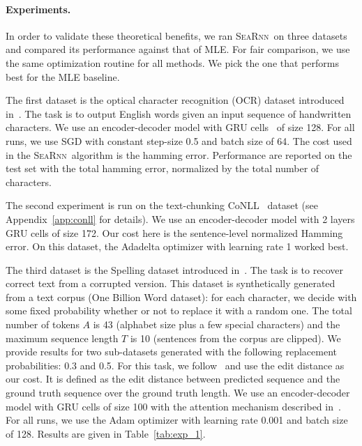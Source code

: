 \documentclass{article}
\newcommand{\SEARNN}{\textsc{SeaRnn}}
\begin{document}
	\vspace{-1mm}
	\paragraph{Experiments.}
	In order to validate these theoretical benefits, we ran \SEARNN\ on three datasets and compared its performance against that of MLE.
	For fair comparison, we use the same optimization routine for all methods. 
	We pick the one that performs best for the MLE baseline. 

	The first dataset is the optical character recognition (OCR) dataset introduced in~\citet{taskar03OCR}.
	The task is to output English words given an input sequence of handwritten characters.
	We use an encoder-decoder model with GRU cells~\citep{Cho2014} of size 128.
	For all runs, we use SGD with constant step-size 0.5 and batch size of 64.
	The cost used in the \SEARNN\ algorithm is the hamming error.
	Performance are reported on the test set with the total hamming error, normalized by the total number of characters.

	The second experiment is run on the text-chunking CoNLL~\citep{Sang2000} dataset (see Appendix~\ref{app:conll} for details).
	We use an encoder-decoder model with 2 layers GRU cells of size 172.
	Our cost here is the sentence-level normalized Hamming error.
    On this dataset, the Adadelta optimizer with learning rate 1 worked best.

	The third dataset is the Spelling dataset introduced in~\citet{Bahdanau2016}.
	The task is to recover correct text from a corrupted version.
    This dataset is synthetically generated from a text corpus (One Billion Word dataset): for each character, we decide with some fixed probability whether or not to replace it with a random one.
	The total number of tokens $A$ is 43 (alphabet size plus a few special characters) and the maximum sequence length $T$ is 10 (sentences from the corpus are clipped).
	We provide results for two sub-datasets generated with the following replacement probabilities:  0.3 and 0.5.
	For this task, we follow~\citet{Bahdanau2016} and use the edit distance as our cost.
	It is defined as the edit distance between predicted sequence and the ground truth sequence over the ground truth length.
	We use an encoder-decoder model with GRU cells of size 100 with the attention mechanism described in~\citep{Bahdanau2016}.
	For all runs, we use the Adam optimizer with learning rate 0.001 and batch size of 128.
	Results are given in Table~\ref{tab:exp_1}.
\end{document}
